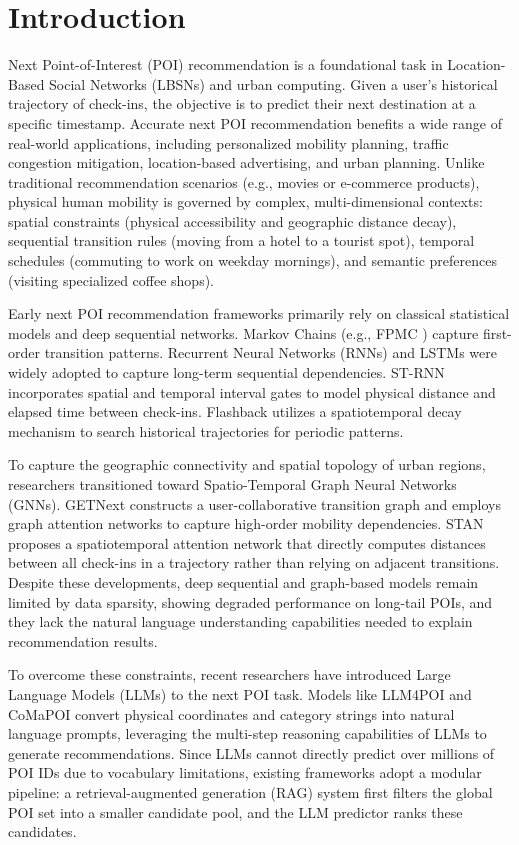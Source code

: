 \documentclass[10pt,twocolumn]{article}
\begin{document}
\section{Introduction}
Next Point-of-Interest (POI) recommendation is a foundational task in Location-Based Social Networks (LBSNs) and urban computing. Given a user's historical trajectory of check-ins, the objective is to predict their next destination at a specific timestamp. Accurate next POI recommendation benefits a wide range of real-world applications, including personalized mobility planning, traffic congestion mitigation, location-based advertising, and urban planning. Unlike traditional recommendation scenarios (e.g., movies or e-commerce products), physical human mobility is governed by complex, multi-dimensional contexts: spatial constraints (physical accessibility and geographic distance decay), sequential transition rules (moving from a hotel to a tourist spot), temporal schedules (commuting to work on weekday mornings), and semantic preferences (visiting specialized coffee shops).

Early next POI recommendation frameworks primarily rely on classical statistical models and deep sequential networks. Markov Chains (e.g., FPMC \cite{sasrec}) capture first-order transition patterns. Recurrent Neural Networks (RNNs) and LSTMs were widely adopted to capture long-term sequential dependencies. ST-RNN \cite{st_rnn} incorporates spatial and temporal interval gates to model physical distance and elapsed time between check-ins. Flashback \cite{flashback} utilizes a spatiotemporal decay mechanism to search historical trajectories for periodic patterns.

To capture the geographic connectivity and spatial topology of urban regions, researchers transitioned toward Spatio-Temporal Graph Neural Networks (GNNs). GETNext \cite{getnext} constructs a user-collaborative transition graph and employs graph attention networks to capture high-order mobility dependencies. STAN \cite{stan} proposes a spatiotemporal attention network that directly computes distances between all check-ins in a trajectory rather than relying on adjacent transitions. Despite these developments, deep sequential and graph-based models remain limited by data sparsity, showing degraded performance on long-tail POIs, and they lack the natural language understanding capabilities needed to explain recommendation results.

To overcome these constraints, recent researchers have introduced Large Language Models (LLMs) to the next POI task. Models like LLM4POI \cite{llm4poi} and CoMaPOI \cite{comapoi} convert physical coordinates and category strings into natural language prompts, leveraging the multi-step reasoning capabilities of LLMs to generate recommendations. Since LLMs cannot directly predict over millions of POI IDs due to vocabulary limitations, existing frameworks adopt a modular pipeline: a retrieval-augmented generation (RAG) system first filters the global POI set into a smaller candidate pool, and the LLM predictor ranks these candidates.
\end{document}
